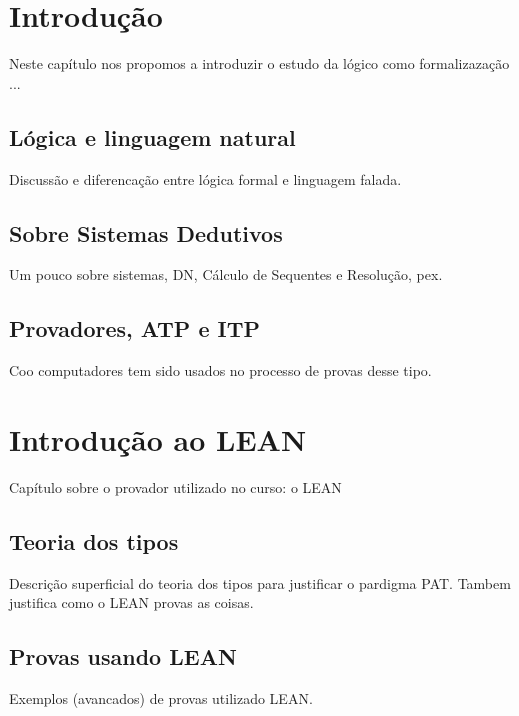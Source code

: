 \chapter{Introdução}
Neste capítulo nos propomos a introduzir o estudo da lógico como formalizazação ...

\section{Lógica e linguagem natural}
Discussão e diferencação entre lógica formal e linguagem falada.

\section{Sobre Sistemas Dedutivos}
Um pouco sobre sistemas, DN, Cálculo de Sequentes e Resolução, pex.

\section{Provadores, ATP e ITP}
Coo computadores tem sido usados no processo de provas desse tipo.

\chapter{Introdução ao LEAN}
Capítulo sobre o provador utilizado no curso: o LEAN

\section{Teoria dos tipos}
Descrição superficial do teoria dos tipos para justificar o pardigma PAT.
Tambem justifica como o LEAN provas as coisas.

\section{Provas usando LEAN}
Exemplos (avancados) de provas utilizado LEAN.
